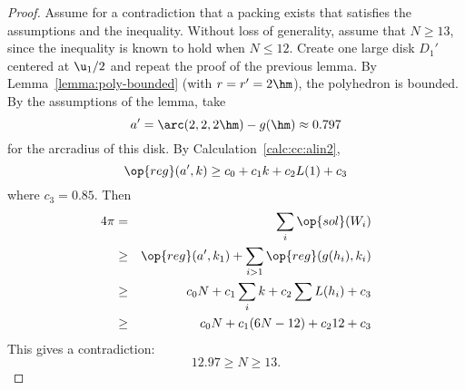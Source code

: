 \begin{proof} Assume for a contradiction that a packing exists that
satisfies the assumptions and the inequality.  Without loss of
generality, assume that $N\ge 13$, since the inequality is known to
hold when $N\le 12$.  Create one large disk $D_1'$ centered at $
\u_1/2$ and repeat the proof of the previous lemma.  By
Lemma~\ref{lemma:poly-bounded} (with $r=r'=2\hm$), the polyhedron is
bounded.  By the assumptions of the lemma, take
\begin{displaymath}a'=\arc(2,2,2\hm)-g(\hm) \approx 0.797\end{displaymath}
for the arcradius of this disk.  
By Calculation~\ref{calc:cc:alin2}, %
\begin{displaymath}\op{reg}(a',k) \ge c_0 + c_1 k + c_2 L(1) +
c_3\end{displaymath}
where $c_3 = 0.85$.
Then 
\begin{eqnarray*}
4\pi &=& \sum_i\op{sol}(W_i)\\
&\ge& \op{reg}(a',k_1)+\sum_{i>1} \op{reg}(g(h_i),k_i) \\
&\ge&  c_0 N +c_1\sum_i k + c_2 \sum L(h_i) + c_3\\
&\ge& c_0 N +c_1 (6N-12) + c_2 12 + c_3\\
\end{eqnarray*}
This gives a contradiction:
\begin{displaymath}
12.97 \ge N \ge 13.
\end{displaymath}
\end{proof}
